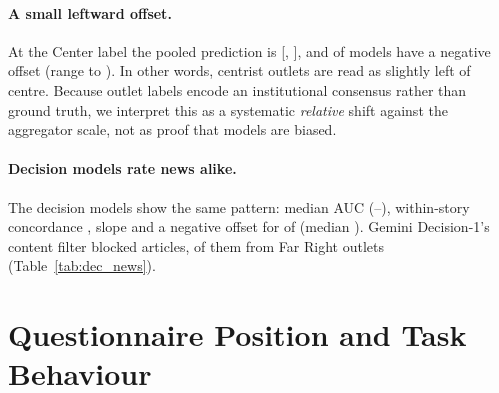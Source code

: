 \documentclass[11pt]{article}
\newcommand{\swatch}[1]{\fcolorbox{gray!50}{#1}{\rule{0pt}{4pt}\rule{6pt}{0pt}}}
\begin{document}
\paragraph{A small leftward offset.}
At the Center label the pooled prediction is \nMixInt{} [\nMixIntLo, \nMixIntHi], and \nNegOffsetCount{} of \nNModelsNews{} models have a negative offset (range \nOffsetMin{} to \nOffsetMax). In other words, centrist outlets are read as slightly left of centre. Because outlet labels encode an institutional consensus rather than ground truth, we interpret this as a systematic \emph{relative} shift against the aggregator scale, not as proof that models are biased.

\paragraph{Decision models rate news alike.}
The \nDNNews{} decision models show the same pattern: median AUC \nDNNewsAUC{} (\nDNNewsAUCLo--\nDNNewsAUCHi), within-story concordance \nDNNewsConc, slope \nDNNewsSlope{} and a negative offset for \nDNNewsNeg{} of \nDNNews{} (median \nDNNewsOffset). Gemini Decision-1's content filter blocked \nGemRefused{} articles, \nGemRefFarRight{} of them from Far Right outlets (Table~\ref{tab:dec_news}).

\section{Questionnaire Position and Task Behaviour}
\label{sec:link}

\begin{table}[t]
\centering
\small
\setlength{\tabcolsep}{2.8pt}
\caption{Spearman correlations between questionnaire scores and news-rating behaviour, within each population. \swatch{hlGood}~$p_{\text{FDR}}<.05$ (chat) or $p<.05$ (decision). \swatch{hlGray}~the headline null: ideology does not predict the direction of a model's lean. \emph{Center}: mean rating of Center-labelled articles. Bootstrap CIs are in the text and in released files.}
\label{tab:link}
\vspace{-3mm}
\end{table}
\end{document}
